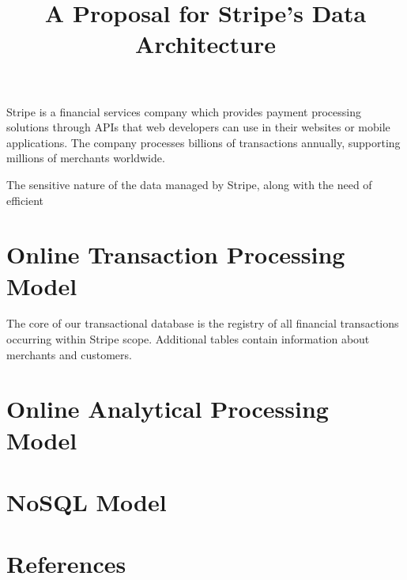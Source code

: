 \documentclass[11pt,a4paper,computermodern]{article}
\title{A Proposal for Stripe's Data Architecture}
\date{}
\begin{document}
\maketitle

\vspace{-10mm}

Stripe is a financial services company which provides payment processing solutions through APIs that web developers can use in their websites or mobile applications. The company processes billions of transactions annually, supporting millions of merchants worldwide.

The sensitive nature of the data managed by Stripe, along with the need of efficient

\section*{Online Transaction Processing Model}

The core of our transactional database is the registry of all financial transactions occurring within Stripe scope. Additional tables contain information about merchants and customers.


\section*{Online Analytical Processing Model}




\section*{NoSQL Model}



\vspace{.0cm}
\section*{References}
\end{document}
